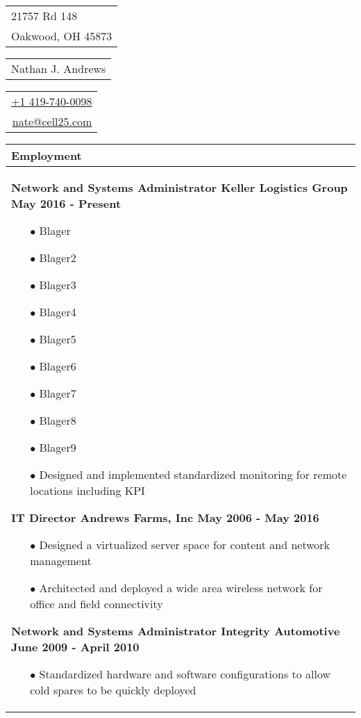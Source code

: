 \documentclass{article}
\begin{document}
\sffamily%
{\small\begin{tabular}[c]{l}
  21757 Rd 148 \\
  Oakwood, OH 45873
\end{tabular}}\hfill%
{\Large\bfseries\begin{tabular}[c]{c}
  Nathan J. Andrews
\end{tabular}}\hfill%
{\small\begin{tabular}[c]{r}
  \href{tel:14197400098}{+1 419-740-0098} \\
  \href{mailto:nate@cell25.com}{nate@cell25.com}
\end{tabular}}%

\bigskip

\begin{tabular}{p{\dimexpr\linewidth-2\tabcolsep}}
  \textbf{Employment} \\
  \hline
  {\bfseries Network and Systems Administrator \hfill Keller Logistics Group \qquad \qquad \qquad May 2016 - Present}
  \begin{itemize}
  	\item[$\bullet$]Blager
  	\item[$\bullet$]Blager2
  	\item[$\bullet$]Blager3
  	\item[$\bullet$]Blager4
  	\item[$\bullet$]Blager5
  	\item[$\bullet$]Blager6
  	\item[$\bullet$]Blager7
  	\item[$\bullet$]Blager8
  	\item[$\bullet$]Blager9
  	\item[$\bullet$]Designed and implemented standardized monitoring for remote locations including KPI
  \end{itemize}
  {\bfseries IT Director \hfill Andrews Farms, Inc \qquad \qquad \qquad May 2006 - May 2016} 
 \begin{itemize}
	\item[$\bullet$]Designed a virtualized server space for content and network management
	\item[$\bullet$]Architected and deployed a wide area wireless network for office and field connectivity
  \end{itemize}
  {\bfseries Network and Systems Administrator \qquad Integrity Automotive \hfill June 2009 - April 2010}
 \begin{itemize}
	\item[$\bullet$]Standardized hardware and software configurations to allow cold spares to be quickly deployed

\end{itemize}
\end{tabular}
\end{document}
